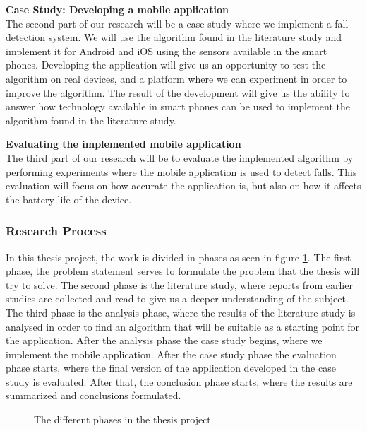 \documentclass[12pt, a4paper, onecolumn]{article}
\newcommand{\parag}[1]{
	\textbf{#1} \hspace{0pt} \\
}
\begin{document}
	\parag{Case Study: Developing a mobile application}
	The second part of our research will be a case study where we implement a fall detection system. We will use the algorithm found in the literature study and implement it for Android and iOS using the sensors available in the smart phones. Developing the application will give us an opportunity to test the algorithm on real devices, and a platform where we can experiment in order to improve the algorithm. The result of the development will give us the ability to answer how technology available in smart phones can be used to implement the algorithm found in the literature study.
	
	\parag{Evaluating the implemented mobile application}
	The third part of our research will be to evaluate the implemented algorithm by performing experiments where the mobile application is used to detect falls. This evaluation will focus on how accurate the application is, but also on how it affects the battery life of the device.
	
	\subsubsection{Research Process}
	
	In this thesis project, the work is divided in phases as seen in figure \ref{fig:research-process}. The first phase, the problem statement serves to formulate the problem that the thesis will try to solve. The second phase is the literature study, where reports from earlier studies are collected and read to give us a deeper understanding of the subject. The third phase is the analysis phase, where the results of the literature study is analysed in order to find an algorithm that will be suitable as a starting point for the application. After the analysis phase the case study begins, where we implement the mobile application. After the case study phase the evaluation phase starts, where the final version of the application developed in the case study is evaluated. After that, the conclusion phase starts, where the results are summarized and conclusions formulated. 
	
	\begin{figure}[H]
		\centering
		\caption{The different phases in the thesis project}%
		\label{fig:research-process}%
	\end{figure}
	
\end{document}
